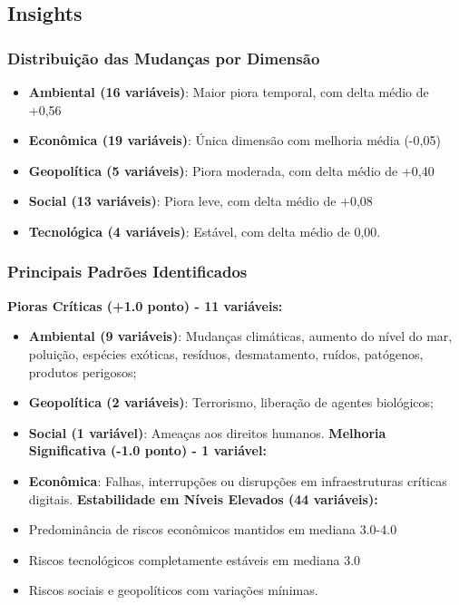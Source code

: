 \documentclass[
  portuguese,
  letterpaper,
  DIV=11,
  numbers=noendperiod]{scrreprt}
\providecommand{\tightlist}{%
  \setlength{\itemsep}{0pt}\setlength{\parskip}{0pt}}
\begin{document}
\subsection{Insights}\label{insights}

\subsubsection{Distribuição das Mudanças por
Dimensão}\label{distribuiuxe7uxe3o-das-mudanuxe7as-por-dimensuxe3o}

\begin{itemize}
\tightlist
\item
  \textbf{Ambiental (16 variáveis)}: Maior piora temporal, com delta
  médio de +0,56
\item
  \textbf{Econômica (19 variáveis)}: Única dimensão com melhoria média
  (-0,05)
\item
  \textbf{Geopolítica (5 variáveis)}: Piora moderada, com delta médio de
  +0,40
\item
  \textbf{Social (13 variáveis)}: Piora leve, com delta médio de +0,08
\item
  \textbf{Tecnológica (4 variáveis)}: Estável, com delta médio de 0,00.
\end{itemize}

\subsubsection{Principais Padrões
Identificados}\label{principais-padruxf5es-identificados}

\textbf{Pioras Críticas (+1.0 ponto) - 11 variáveis:}

\begin{itemize}
\item
  \textbf{Ambiental (9 variáveis)}: Mudanças climáticas, aumento do
  nível do mar, poluição, espécies exóticas, resíduos, desmatamento,
  ruídos, patógenos, produtos perigosos;
\item
  \textbf{Geopolítica (2 variáveis)}: Terrorismo, liberação de agentes
  biológicos;
\item
  \textbf{Social (1 variável)}: Ameaças aos direitos humanos.
  \textbf{Melhoria Significativa (-1.0 ponto) - 1 variável:}
\item
  \textbf{Econômica}: Falhas, interrupções ou disrupções em
  infraestruturas críticas digitais. \textbf{Estabilidade em Níveis
  Elevados (44 variáveis):}
\item
  Predominância de riscos econômicos mantidos em mediana 3.0-4.0
\item
  Riscos tecnológicos completamente estáveis em mediana 3.0
\item
  Riscos sociais e geopolíticos com variações mínimas.
\end{itemize}
\end{document}

